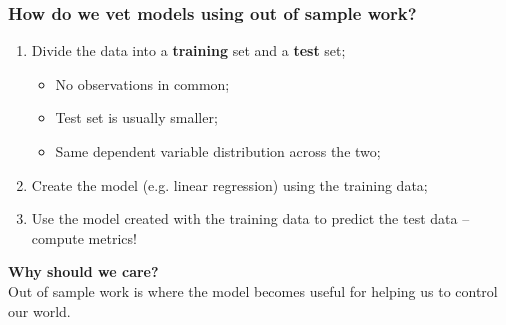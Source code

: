\documentclass[aspectratio=169]{beamer}
\theoremstyle{principle}
\begin{document}
\begin{frame}
\frametitle{How do we vet models using out of sample work?}
\begin{enumerate}

\item Divide the data into a \textbf{training} set and a \textbf{test} set;
\begin{itemize}
\item No observations in common;
\item Test set is usually smaller;
\item Same dependent variable distribution across the two;
\end{itemize}
\bigskip
\bigskip

\item Create the model (e.g. linear regression) using the training data;
\bigskip
\bigskip

\item Use the model created with the training data to predict the test data -- compute metrics!

\end{enumerate}

\end{frame}

\begin{frame}

\begin{center}
\Huge\textbf{Why should we care?}\\
\bigskip
\bigskip
\large Out of sample work is where the model becomes useful for helping us to control our world.\\
\end{center}

\end{frame}
\end{document}
